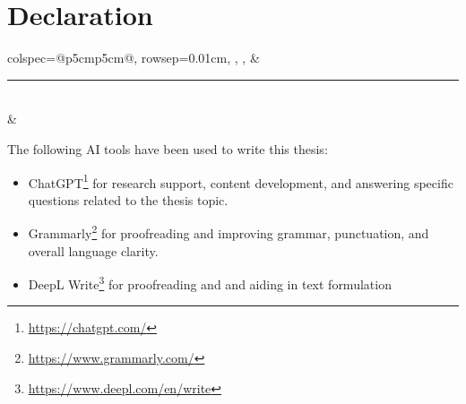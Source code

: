 %
\chapter*{Declaration}
\label{sec:declaration}
\thispagestyle{empty}


\vspace{2cm}

\begin{tblr}{
  colspec={@{}p{5cm}p{5cm}@{}},
  rowsep=0.01cm,
  }
  \thesisUniversityCity, \thesisDate, & \rule{\linewidth}{0.4pt} \\
                                      &  \thesisName
\end{tblr}

\vfill

The following AI tools have been used to write this thesis:
\begin{itemize}
  \item ChatGPT\footnote{\url{https://chatgpt.com/}} for research support, content development, and answering specific questions related to the thesis topic.
  \item Grammarly\footnote{\url{https://www.grammarly.com/}} for proofreading and improving grammar, punctuation, and overall language clarity.
  \item DeepL Write\footnote{\url{https://www.deepl.com/en/write}} for proofreading and and aiding in text formulation
\end{itemize}





